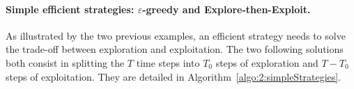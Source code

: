 

\paragraph{Simple efficient strategies: $\varepsilon$-greedy and Explore-then-Exploit.}

As illustrated by the two previous examples, an efficient strategy needs to solve the trade-off between exploration and exploitation.
The two following solutions both consist in splitting the $T$ time steps into $T_0$ steps of exploration and $T-T_0$ steps of exploitation.
They are detailed in Algorithm~\ref{algo:2:simpleStrategies}.


